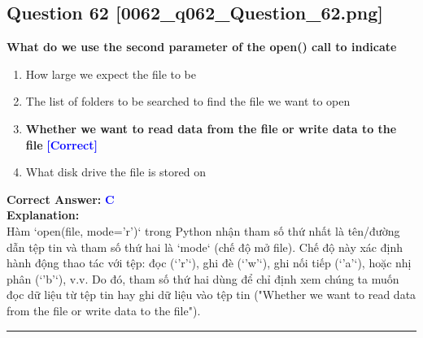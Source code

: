 \documentclass[11pt,a4paper]{article}
\begin{document}
\begin{minipage}{\textwidth}
\subsection*{Question 62 \quad \footnotesize{[0062_q062_Question_62.png]}}
\noindent \textbf{What do we use the second parameter of the open() call to indicate}

\begin{enumerate}[label=\Alph*.]
    \item How large we expect the file to be
    \item The list of folders to be searched to find the file we want to open
    \item \textbf{Whether we want to read data from the file or write data to the file} \hfill \textcolor{blue}{\textbf{[Correct]}}
    \item What disk drive the file is stored on
\end{enumerate}

\noindent \textbf{Correct Answer:} \textcolor{blue}{\textbf{C}} \\[4pt]
\noindent \textbf{Explanation:}\\
Hàm `open(file, mode='r')` trong Python nhận tham số thứ nhất là tên/đường dẫn tệp tin và tham số thứ hai là `mode` (chế độ mở file). Chế độ này xác định hành động thao tác với tệp: đọc (`'r'`), ghi đè (`'w'`), ghi nối tiếp (`'a'`), hoặc nhị phân (`'b'`), v.v. Do đó, tham số thứ hai dùng để chỉ định xem chúng ta muốn đọc dữ liệu từ tệp tin hay ghi dữ liệu vào tệp tin ("Whether we want to read data from the file or write data to the file").
\end{minipage}
\vspace{0.8cm}
\hrule
\vspace{0.5cm}
\end{document}
